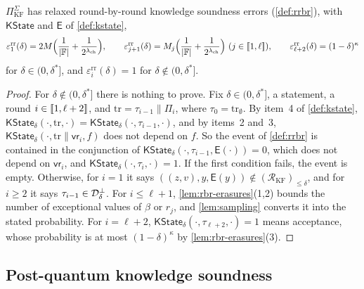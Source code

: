 \begin{theorem}\label{thm:rrbr}
$\Pi^\Sigma_{\mathrm{KF}}$ has relaxed round-by-round knowledge soundness errors (\cref{def:rrbr}), with $\mathsf{KState}$ and $\mathsf{E}$ of \cref{def:kstate},
\[
  \varepsilon^{\mathrm{rr}}_1(\delta) = 2M\Bigl(\frac{1}{|\mathbb{F}|} + \frac{1}{2^{\lambda_{\mathrm{ch}}}}\Bigr), \qquad
  \varepsilon^{\mathrm{rr}}_{j+1}(\delta) = M_j\Bigl(\frac{1}{|\mathbb{F}|} + \frac{1}{2^{\lambda_{\mathrm{ch}}}}\Bigr) \ (j \in \llbracket 1, \ell \rrbracket), \qquad
  \varepsilon^{\mathrm{rr}}_{\ell+2}(\delta) = (1-\delta)^\kappa
\]
for $\delta \in (0,\delta^*]$, and $\varepsilon^{\mathrm{rr}}_i(\delta) = 1$ for $\delta \notin (0,\delta^*]$.
\end{theorem}

\begin{proof}
For $\delta \notin (0,\delta^*]$ there is nothing to prove. Fix $\delta \in (0,\delta^*]$, a statement, a round $i \in \llbracket 1, \ell+2 \rrbracket$, and $\mathrm{tr} = \tau_{i-1} \| \Pi_i$, where $\tau_0 = \mathrm{tr}_\emptyset$.
By item~4 of \cref{def:kstate}, $\mathsf{KState}_\delta(\cdot, \mathrm{tr}, \cdot) = \mathsf{KState}_\delta(\cdot, \tau_{i-1}, \cdot)$, and by items~2 and~3, $\mathsf{KState}_\delta(\cdot, \mathrm{tr} \| \mathsf{vr}_i, f)$ does not depend on $f$.
So the event of \cref{def:rrbr} is contained in the conjunction of $\mathsf{KState}_\delta(\cdot, \tau_{i-1}, \mathsf{E}(\cdot)) = 0$, which does not depend on $\mathsf{vr}_i$, and $\mathsf{KState}_\delta(\cdot, \tau_i, \cdot) = 1$.
If the first condition fails, the event is empty. Otherwise, for $i = 1$ it says $((z,v), y, \mathsf{E}(y)) \notin (\mathcal{R}_{\mathrm{KF}})_{\le\delta}$, and for $i \ge 2$ it says $\tau_{i-1} \in \mathcal{D}^\bot_\delta$.
For $i \le \ell+1$, \cref{lem:rbr-erasures}(1,2) bounds the number of exceptional values of $\beta$ or $r_j$, and \cref{lem:sampling} converts it into the stated probability.
For $i = \ell+2$, $\mathsf{KState}_\delta(\cdot, \tau_{\ell+2}, \cdot) = 1$ means acceptance, whose probability is at most $(1-\delta)^\kappa$ by \cref{lem:rbr-erasures}(3).
\end{proof}

\subsection{Post-quantum knowledge soundness}\label{sec:pq:main}


